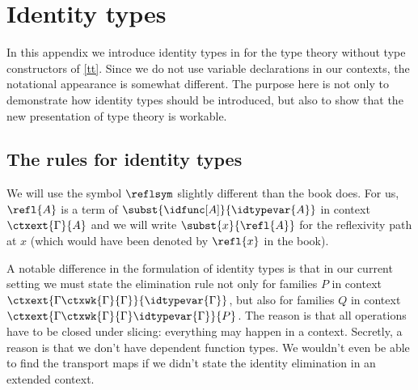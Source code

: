 \section{Identity types}
In this appendix we introduce identity types in for the type theory without type
constructors of \autoref{tt}. Since we do not use variable declarations in our
contexts, the notational appearance is somewhat different. The purpose here is
not only to demonstrate how identity types should be introduced, but also to
show that the new presentation of type theory is workable.

\subsection{The rules for identity types}
We will use the symbol $\reflsym$ slightly different than the book does. For us,
$\refl{A}$ is a term of $\subst{\idfunc[A]}{\idtypevar{A}}$ in context
$\ctxext{\Gamma}{A}$ and we will write $\subst{x}{\refl{A}}$ for the reflexivity
path at $x$ (which would have been denoted by $\refl{x}$ in the book).

A notable difference in the formulation of identity types is that in our current
setting we must state the elimination rule not only for families $P$ in context
$\ctxext{{\Gamma}{\ctxwk{\Gamma}{\Gamma}}}{\idtypevar{\Gamma}}$,
but also for families $Q$ in context 
$\ctxext{{{\Gamma}{\ctxwk{\Gamma}{\Gamma}}}{\idtypevar{\Gamma}}}{P}$. The reason
is that all operations have to be closed under slicing: everything may happen
in a context. Secretly, a reason is that we don't have dependent function types.
We wouldn't even be able to find the transport maps if we didn't state the
identity elimination in an extended context.

